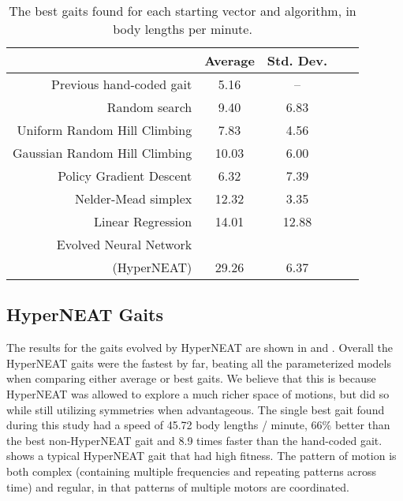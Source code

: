 \begin{table}
\begin{center}
\begin{tabular}{|r|c|c|c||c|}
\hline
                                         & Average & Std. Dev. \\
\hline                                    
\hline                                    
Previous hand-coded gait                 & 5.16   &   --     \\
\hline
Random search                            & 9.40   &   6.83   \\
\hline
Uniform Random Hill Climbing             & 7.83   &   4.56   \\
\hline
Gaussian Random Hill Climbing            & 10.03  &   6.00   \\
\hline
Policy Gradient Descent                  & 6.32   &   7.39   \\
\hline
Nelder-Mead simplex                      & 12.32  &   3.35   \\
\hline
Linear Regression                        & 14.01  &  12.88   \\
\hline
Evolved Neural Network              &        &          \\
(HyperNEAT)                              & 29.26  &   6.37   \\
\hline
\end{tabular}
\caption{The best gaits found for each starting vector and algorithm,
  in body lengths per minute.}
\end{center}
\end{table}







\subsection{HyperNEAT Gaits}

The results for the gaits evolved by HyperNEAT are shown in
 and .  Overall the HyperNEAT gaits
were the fastest by far, beating all the parameterized models when
comparing either average or best gaits.  We believe that this is
because HyperNEAT was allowed to explore a much richer space of
motions, but did so while still utilizing symmetries when
advantageous.  The single best gait found during this study had a
speed of 45.72 body lengths / minute, 66\% better than the best
non-HyperNEAT gait and 8.9 times faster than the hand-coded gait.
 shows a typical
HyperNEAT gait that had high fitness.  The pattern of motion is both
complex (containing multiple frequencies and repeating patterns across
time) and regular, in that patterns of multiple motors are
coordinated.

